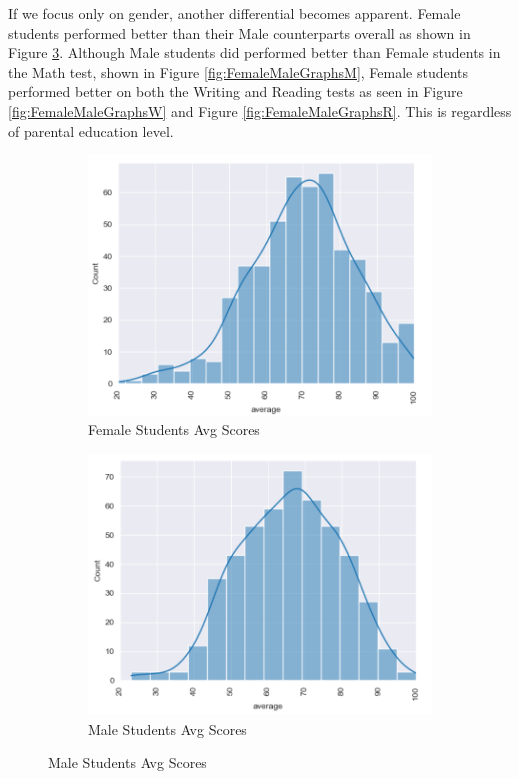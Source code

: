 \documentclass[man,floatsintext]{apa6} %
\begin{document}
If we focus only on gender, another differential becomes apparent. Female students performed better than their Male counterparts overall as shown in Figure \ref{fig:FemaleMaleAvgScores}. Although Male students did performed better than Female students in the Math test, shown in Figure \ref{fig:FemaleMaleGraphsM}, Female students performed better on both the Writing and Reading tests as seen in Figure \ref{fig:FemaleMaleGraphsW} and Figure \ref{fig:FemaleMaleGraphsR}. This is regardless of parental education level.
\begin{figure}[H]
    \centering
    \caption{Average Standardized Scores by Gender}
    \begin{subfigure}[b]{0.4\textwidth}
        \includegraphics[width=\linewidth]{FemaleAverageScoreCurve.png}
        \caption{Female Students Avg Scores}
        \label{fig:FemaleAvg}
    \end{subfigure}
    \begin{subfigure}[b]{0.4\textwidth}
        \includegraphics[width=\linewidth]{MaleAverageScoreCurve.png}
        \caption{Male Students Avg Scores}
        \label{fig:MaleAvg}
    \end{subfigure}
    \label{fig:FemaleMaleAvgScores}
\end{figure}
\end{document}
